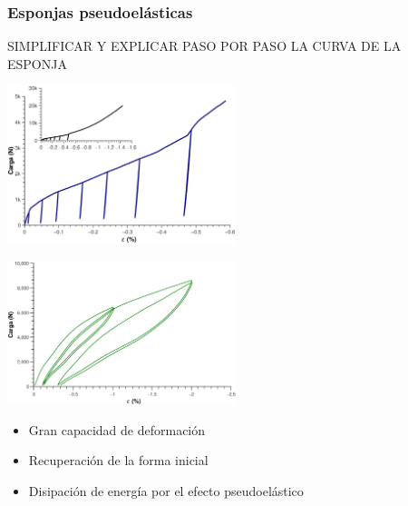 \documentclass[usenames,dvipsnames]{beamer}
\begin{document}
\begin{frame}

\frametitle{Esponjas pseudoelásticas}

SIMPLIFICAR Y EXPLICAR PASO POR PASO LA CURVA DE LA ESPONJA 

\begin{multicols}{2}

\includegraphics[width=0.5\textwidth]{img/intro/Cucompararesponja.eps}

\includegraphics[width=0.5\textwidth]{img/intro/EsponjacompararCu.eps}

\end{multicols}


 \begin{itemize}
  \item {Gran capacidad de deformación}
  \item {Recuperación de la forma inicial}
  \item {Disipación de energía por el efecto pseudoelástico}
 \end{itemize}

\end{frame}


% 
%   
%  

% 
% 
% 
%  
\end{document}
